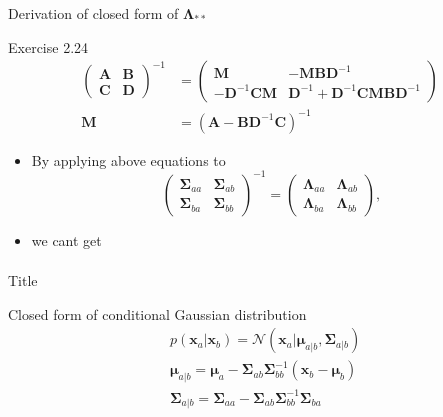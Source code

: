 \documentclass[10pt]{beamer}
\begin{document}
    \begin{frame}{Derivation of closed form of $\bm\Lambda_{**}$}
        \begin{block}{Exercise 2.24}
            \begin{align*}
                \begin{pmatrix}
                    \mathbf A & \mathbf B \\
                    \mathbf C & \mathbf D
                \end{pmatrix}^{-1} &= 
                \begin{pmatrix}
                    \mathbf M & -\mathbf M\mathbf B\mathbf D^{-1} \\
                    -\mathbf D^{-1}\mathbf C\mathbf M & \mathbf D^{-1}+\mathbf D^{-1}\mathbf C\mathbf M \mathbf B \mathbf D^{-1}
                \end{pmatrix} \tag{2.76}\\
                \mathbf M &= (\mathbf A - \mathbf B\mathbf D^{-1}\mathbf C)^{-1} \tag{2.77}
            \end{align*}
        \end{block}
        \begin{itemize}
            \item By applying above equations to
            \[
                \begin{pmatrix}
                    \bm \Sigma_{aa} & \bm \Sigma_{ab} \\
                    \bm \Sigma_{ba} & \bm \Sigma_{bb} 
                \end{pmatrix}^{-1}
                =
                \begin{pmatrix}
                    \bm \Lambda_{aa} & \bm \Lambda_{ab} \\
                    \bm \Lambda_{ba} & \bm \Lambda_{bb} 
                \end{pmatrix}, \tag{2.78}
            \]
            \item we cant get
            \begin{align*}
            \end{align*}
        \end{itemize}
    \end{frame}
    
    \begin{frame}{Title}
        \begin{block}{Closed form of conditional Gaussian distribution}
            \begin{align*}
                &p(\mathbf x_a | \mathbf x_b) = \mathcal N(\mathbf x_a | \bm \mu_{a|b}, \bm \Sigma_{a|b})  \\
                &\bm\mu_{a|b} = \bm\mu_a - \bm\Sigma_{ab}\bm\Sigma_{bb}^{-1}(\mathbf x_b - \bm\mu_b) \tag{2.81}\\
                &\bm\Sigma_{a|b} = \bm\Sigma_{aa}-\bm\Sigma_{ab}\bm\Sigma_{bb}^{-1}\bm\Sigma_{ba} \tag{2.82}
            \end{align*}
        \end{block}
    \end{frame}
    
\end{document}
